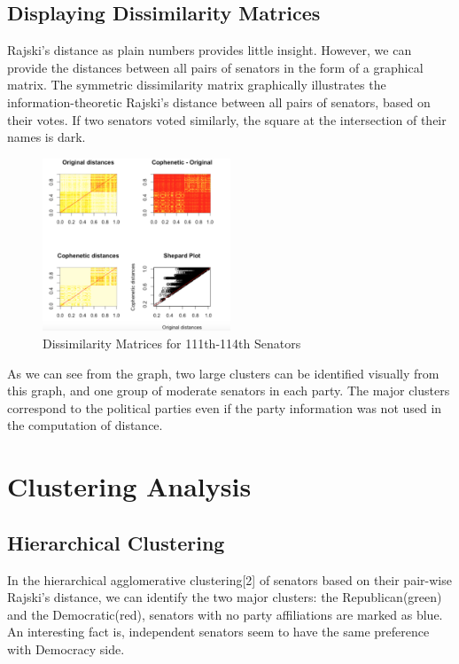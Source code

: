 \documentclass{article} %
\begin{document}
\subsection{Displaying Dissimilarity Matrices}
Rajski's distance as plain numbers provides little insight. However, we can provide the distances between all pairs of senators in the form of a graphical matrix. The symmetric dissimilarity matrix graphically illustrates the information-theoretic Rajski's distance between all pairs of senators, based on their votes. If two senators voted similarly, the square at the intersection of their names is dark. 
\begin{figure}[h]
\begin{center}
\includegraphics[width=0.5\textwidth]{fig1}
\end{center}
\caption{Dissimilarity Matrices for 111th-114th Senators}
\end{figure}
As we can see from the graph, two large clusters can be identified visually from this graph, and one group of moderate senators in each party. The major clusters correspond to the political parties even if the party information was not used in the computation of distance.
\section{Clustering Analysis}
\subsection{Hierarchical Clustering}
In the hierarchical agglomerative clustering[2] of senators based on their pair-wise Rajski's distance, we can identify the two major clusters: the Republican(green) and the Democratic(red), senators with no party affiliations are marked as blue. An interesting fact is, independent senators seem to have the same preference with Democracy side.
\end{document}
